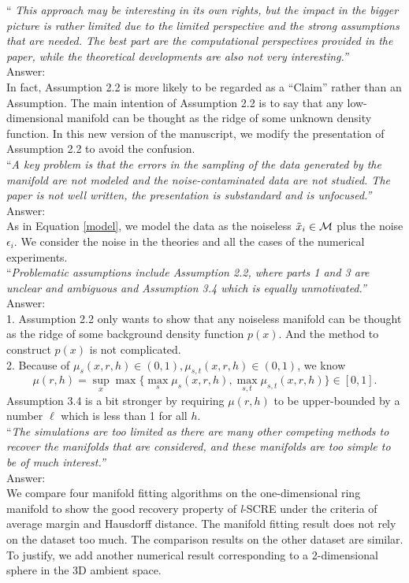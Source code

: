 \documentclass[12pt]{article}
\begin{document}
\noindent ``\textit{ This approach may be interesting in its own rights, but the impact in the bigger picture is rather limited due to the limited perspective and the strong assumptions that are needed. The best part are the computational perspectives provided in the paper, while the theoretical developments are also not very interesting.'' }\\
Answer:\\
In fact, Assumption 2.2 is more likely to be regarded as a ``Claim'' rather than an Assumption. The main intention of Assumption 2.2 is to say that any low-dimensional manifold can be thought as the ridge of some unknown density function. In this new version of the manuscript, we modify the presentation of Assumption 2.2 to avoid the confusion.
\\
\noindent ``\textit {A key problem is that the errors in the sampling of the data generated by the manifold are not modeled and the noise-contaminated data are not studied. The paper is not well written, the presentation is substandard  and is unfocused.'' }\\
Answer:\\
As in Equation \eqref{model}, we model the data as the noiseless $\tilde{x}_i\in \cal M$ plus the noise $\epsilon_i$. We consider the noise in the theories and all the cases of the numerical experiments.\\

\noindent ``\textit{Problematic assumptions include Assumption 2.2, where parts 1 and 3 are unclear and ambiguous and Assumption 3.4 which is equally unmotivated.''}\\
Answer:\\
1. Assumption 2.2 only wants to show that any noiseless manifold can be thought as the ridge of some background density function $p(x)$. And the method to construct $p(x)$ is not complicated.\\
2. Because of $\mu_s(x,r,h)\in(0,1),\mu_{s,t}(x,r,h)\in (0,1)$, we know 
\[
\mu(r,h) = \sup_x \max\{\max_s \mu_s(x,r,h), \max_{s,t}\mu_{s,t}(x,r,h)\}\in [0,1].
\]
Assumption 3.4 is a bit stronger by requiring $\mu(r,h)$ to be upper-bounded by a number $\ell$ which is less than 1 for all $h$.\\
 \noindent ``\textit{The simulations are too limited as there are many other competing methods to recover the manifolds that are considered, and these manifolds are too simple to be of much interest.'' } \\
 Answer:\\
 We compare four manifold fitting algorithms on the one-dimensional ring manifold to show the good recovery property of {\it l}-SCRE under the criteria of average margin and Hausdorff distance. The manifold fitting result does not rely on the dataset too much. The comparison results on the other dataset are similar. To justify, we add another numerical result corresponding to a 2-dimensional sphere in the 3D ambient space.
\end{document}
